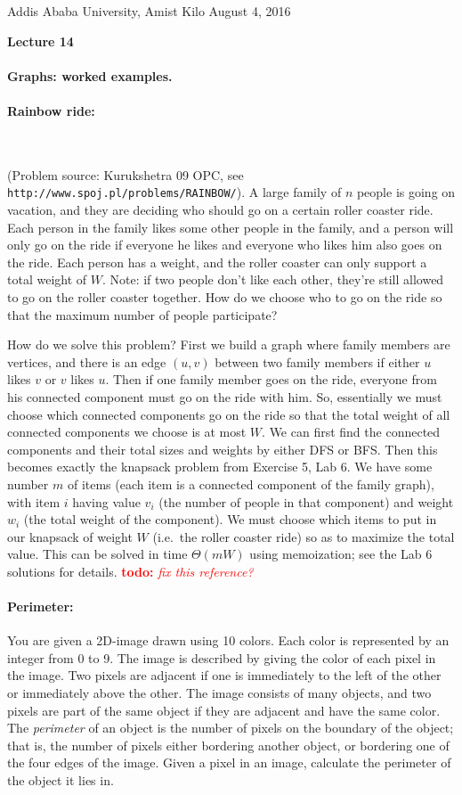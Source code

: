 \documentclass[11pt]{article}
\newcommand{\TODO}[1]{\textcolor{red}{\textbf{todo:} \textit{#1}}}
\newlength{\toppush}
\newcommand{\htitle}[2]{\noindent\vspace*{-\toppush}\newline\parbox{6.5in}
 {\large Addis Ababa University, Amist Kilo \hfill #1\newline
\hspace*{\fill}{\bf Algorithms and Programming for High Schoolers} \hspace*{\fill} \newline
\mbox{}\hrulefill\mbox{}}\vspace*{1ex}\mbox{}\newline
\begin{center}{\Large\bf #2}\end{center}}
\begin{document}
\htitle{August 4, 2016}{Lecture 14}

\paragraph{\Large Graphs: worked examples.}

\paragraph{\Large Rainbow ride:}\ 

\smallskip

\noindent (Problem source: Kurukshetra 09 OPC, see
\texttt{http://www.spoj.pl/problems/RAINBOW/}).  A large family of $n$
people is going on vacation, and they are deciding who should go on a
certain roller coaster ride. Each person in the family likes some
other people in the family, and a person will only go on the ride if
everyone he likes and everyone who likes him also goes on the ride.
Each person has a weight, and the roller coaster can only support a
total weight of $W$.  Note: if two people don't like each other,
they're still allowed to go on the roller coaster together.  How do we
choose who to go on the ride so that the maximum number of people
participate?

How do we solve this problem?  First we build a graph where family
members are vertices, and there is an edge $(u,v)$ between two family
members if either $u$ likes $v$ or $v$ likes $u$.  Then if one family
member goes on the ride, everyone from his connected component must go
on the ride with him.  So, essentially we must choose which connected
components go on the ride so that the total weight of all connected
components we choose is at most $W$.  
We can first find the connected components and their total sizes and
weights by either DFS or BFS.  Then this
becomes exactly the knapsack
problem from Exercise 5, Lab 6.  We have some number $m$ of items
(each item is a connected component of the family graph), with
item $i$ having value $v_i$ (the number of people in that component)
and weight $w_i$ (the total weight of the component).  We must choose
which items to put in our knapsack of weight $W$ (i.e.\ the roller
coaster ride) so as to maximize the total value.  This can be solved
in time $\Theta(mW)$ using memoization; see the Lab 6 solutions for
details. \TODO{fix this reference?}

\paragraph{\Large Perimeter:}
You are given a 2D-image drawn using 10 colors. Each color is
represented by an
integer from 0 to 9. The image is described by giving the color of
each pixel in the image. Two
pixels are adjacent if one is immediately to the left of the other or
immediately above the other.
The image consists of many objects, and two pixels are part of the
same object if they are adjacent
and have the same color. The {\em perimeter} of an object is the
number of pixels on the boundary of the object; that is, the number of
pixels either bordering another object, or bordering one of the four
edges of the image.  Given a pixel in an image, calculate the
perimeter of the object it lies in.
\end{document}
